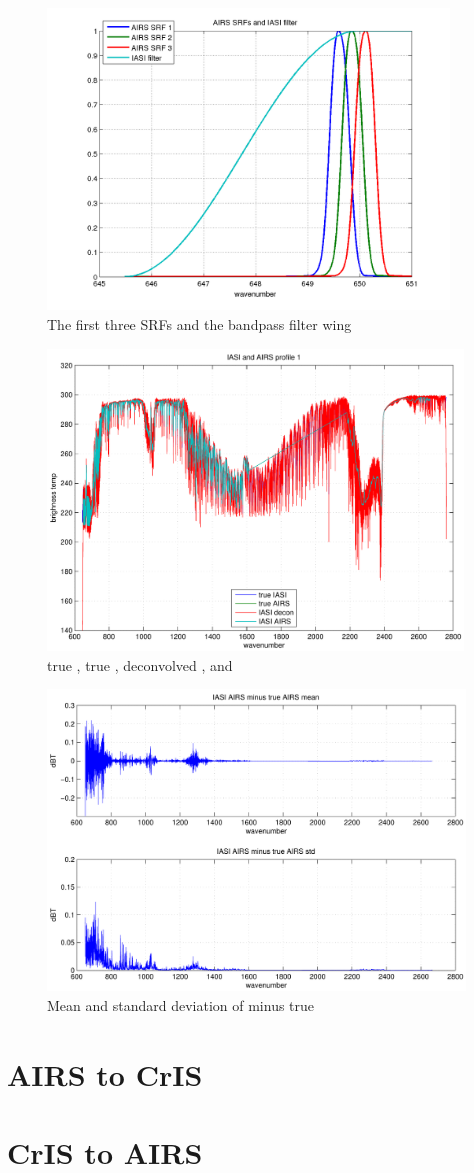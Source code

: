 \documentclass[12pt]{article}
\begin{document}
\begin{figure}
  \centering
  \includegraphics[height=8cm]{figures/srfs_and_filt.png}
  \caption{The first three {\airs} SRFs and the bandpass filter
    wing}
  \label{srfs1}
\end{figure}

\begin{figure}
  \centering
  \includegraphics[height=8cm]{figures/iasi_airs_spec.pdf}
  \caption{true {\iasi}, true {\airs}, deconvolved {\iasi}, and
    {\iasi} {\airs} }
  \label{iaspec}
\end{figure}

\begin{figure}
  \centering
  \includegraphics[height=8cm]{figures/iasi_airs_diff.pdf}
  \caption{Mean and standard deviation of {\iasi} {\airs} minus true
    {\airs} }
  \label{iadiff}
\end{figure}

\FloatBarrier

\section{AIRS to CrIS}

\section{CrIS to AIRS}
\end{document}
